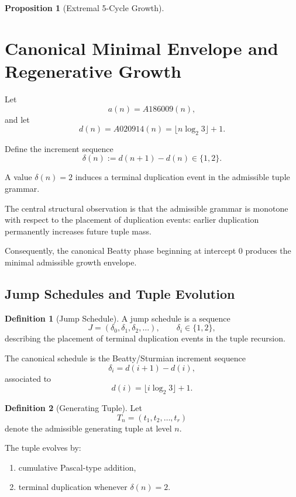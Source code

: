 \documentclass[12pt, oneside]{article}
\numberwithin{equation}{section}
\theoremstyle{definition}
\newtheorem{definition}{Definition}[section]
\newtheorem{proposition}{Proposition}[section]
\theoremstyle{plain}
\theoremstyle{remark}
\begin{document}
\begin{proposition}[Extremal 5-Cycle Growth]
\section{Canonical Minimal Envelope and Regenerative Growth}
\label{sec:minimal-envelope}

Let
\[
a(n)=A186009(n),
\]
and let
\[
d(n)=A020914(n)=\lfloor n\log_2 3\rfloor+1.
\]

Define the increment sequence
\[
\delta(n):=d(n+1)-d(n)\in\{1,2\}.
\]

A value $\delta(n)=2$ induces a terminal duplication event in the
admissible tuple grammar.

The central structural observation is that the admissible grammar is
monotone with respect to the placement of duplication events:
earlier duplication permanently increases future tuple mass.

Consequently, the canonical Beatty phase beginning at intercept $0$
produces the minimal admissible growth envelope.


\subsection{Jump Schedules and Tuple Evolution}


\begin{definition}[Jump Schedule]
A jump schedule is a sequence
\[
J=(\delta_0,\delta_1,\delta_2,\dots),
\qquad
\delta_i\in\{1,2\},
\]
describing the placement of terminal duplication events in the
tuple recursion.

The canonical schedule is the Beatty/Sturmian increment sequence
\[
\delta_i=d(i+1)-d(i),
\]
associated to
\[
d(i)=\lfloor i\log_2 3\rfloor+1.
\]
\end{definition}


\begin{definition}[Generating Tuple]
Let
\[
T_n=(t_1,t_2,\dots,t_r)
\]
denote the admissible generating tuple at level $n$.

The tuple evolves by:
\begin{enumerate}
\item cumulative Pascal-type addition,
\item terminal duplication whenever $\delta(n)=2$.
\end{enumerate}


\end{definition}
\end{proposition}
\end{document}
